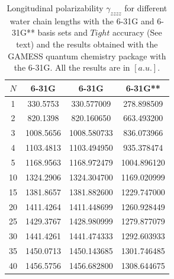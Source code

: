 \documentclass[twocolumn,showpacs,preprintnumbers,amsmath,amssymb]{revtex4}
\begin{document}



\begin{table}
  \centering
  \caption{\protect
    Longitudinal polarizability $\gamma_{zzzz}$
    for different water chain lengths with the 6-31G and 6-31G** basis sets
    and $Tight$ accuracy (See text) and the results obtained with
    the GAMESS quantum chemistry package \cite{gamess} with the 6-31G. 
    All the results are in $[a.u.]$.
  }\label{tab:Polari_1D_Values}
  \begin{ruledtabular}
    \begin{tabular}{cccc}
      $N$ &\multicolumn{1}{c}{6-31G\footnotemark[1]}
      &\multicolumn{1}{c}{6-31G\footnotemark[2]}
      &\multicolumn{1}{c}{6-31G**\footnotemark[2]}\\
      \hline
      1 &  330.5753 &  330.577009 &  278.898509 \\
      2 &  820.1398 &  820.160650 &  663.493200 \\
      3 & 1008.5656 & 1008.580733 &  836.073966 \\
      4 & 1103.4813 & 1103.494950 &  935.378474 \\
      5 & 1168.9563 & 1168.972479 & 1004.896120 \\
     10 & 1324.2906 & 1324.304700 & 1169.020999 \\
     15 & 1381.8657 & 1381.882600 & 1229.747000 \\
     20 & 1411.4264 & 1411.448699 & 1260.928449 \\
     25 & 1429.3767 & 1428.980999 & 1279.877079 \\
     30 & 1441.4261 & 1441.474333 & 1292.603933 \\
     35 & 1450.0713 & 1450.143685 & 1301.746485 \\
     40 & 1456.5756 & 1456.682800 & 1308.644675 \\
    \end{tabular}
  \end{ruledtabular}
\end{table}
\end{document}
